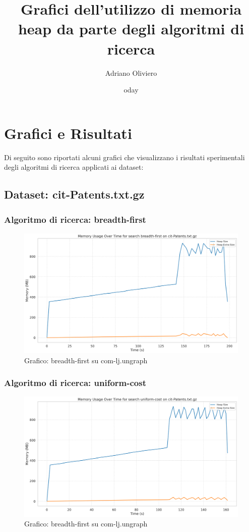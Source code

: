 \documentclass{article}
\title{Grafici dell'utilizzo di memoria heap da parte degli algoritmi di ricerca}
\author{Adriano Oliviero}
\date{	oday}
\begin{document}
\maketitle
\tableofcontents
\newpage
\section{Grafici e Risultati}
Di seguito sono riportati alcuni grafici che visualizzano i risultati sperimentali degli algoritmi di ricerca applicati ai dataset:
\subsection{Dataset: cit-Patents.txt.gz}
\subsubsection{Algoritmo di ricerca: breadth-first}
\begin{figure}[h]\centering
\includegraphics[width=\textwidth]{../plots/cit-Patents_breadth-first.png}
\caption{Grafico: breadth-first su com-lj.ungraph}
\end{figure}
\subsubsection{Algoritmo di ricerca: uniform-cost}
\begin{figure}[h]\centering
\includegraphics[width=\textwidth]{../plots/cit-Patents_uniform-cost.png}
\caption{Grafico: breadth-first su com-lj.ungraph}
\end{figure}
\end{document}
